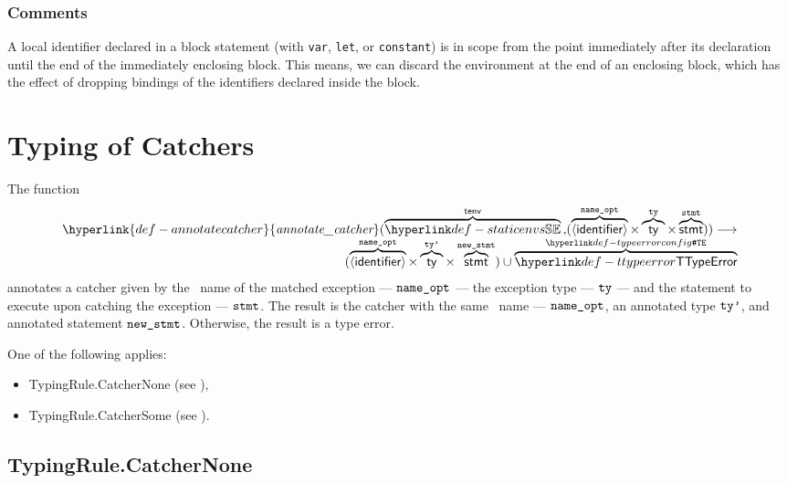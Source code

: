 \documentclass{book}
\newcommand\ProseOtherwiseTypeError[0]{Otherwise, the result is a type error.}
\newcommand\annotatecatcher[1]{\hyperlink{def-annotatecatcher}{\textfunc{annotate\_catcher}}(#1)}
\begin{document}
\subsection{Comments}
A local identifier declared in a block statement (with \texttt{var}, \texttt{let}, or \texttt{constant})
is in scope from the point immediately after its declaration until the end of the
immediately enclosing block. This means, we can discard the environment at the end of
an enclosing block, which has the effect of dropping bindings of the identifiers declared inside the block.


\chapter{Typing of Catchers}
\hypertarget{def-annotatecatcher}{}
The function
\[
\begin{array}{r}
  \annotatecatcher{
    \overname{\staticenvs}{\tenv} \aslsep
    (\overname{\langle\identifier\rangle}{\nameopt} \times \overname{\ty}{\tty} \times \overname{\stmt}{\vstmt})
  } \aslto \\
  (\overname{\langle\identifier\rangle}{\nameopt} \times \overname{\ty}{\ttyp} \times \overname{\stmt}{\newstmt})
  \cup \overname{\TTypeError}{\TypeErrorConfig}
\end{array}
\]
annotates a catcher given by the \optional\ name of the matched exception --- $\texttt{name\_opt}$ ---
the exception type --- $\texttt{ty}$ --- and the statement to execute upon catching the exception --- $\texttt{stmt}$.
The result is the catcher with the same \optional\ name --- $\texttt{name\_opt}$, an annotated type $\texttt{ty'}$, and annotated statement $\texttt{new\_stmt}$.
\ProseOtherwiseTypeError

One of the following applies:
\begin{itemize}
\item TypingRule.CatcherNone (see ),
\item TypingRule.CatcherSome (see ).
\end{itemize}

\section{TypingRule.CatcherNone \label{sec:TypingRule.CatcherNone}}
\end{document}
